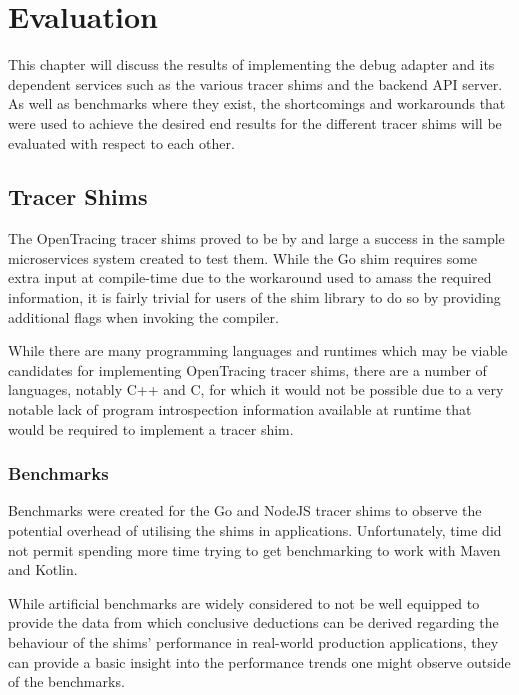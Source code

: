 \documentclass[12pt,pdftex,titlepage]{report}
\begin{document}
                    
    \chapter{Evaluation}
        This chapter will discuss the results of implementing the debug adapter and its dependent services such as the various tracer shims and the backend API server. As well as benchmarks where
        they exist, the shortcomings and workarounds that were used to achieve the desired end results for the different tracer shims will be evaluated with respect to each other.

        \bigskip
        \section{Tracer Shims}
            The OpenTracing tracer shims proved to be by and large a success in the sample microservices system created to test them. While the Go shim requires some extra input at compile-time due to the
            workaround used to amass the required information, it is fairly trivial for users of the shim library to do so by providing additional flags when invoking the compiler.

            While there are many programming languages and runtimes which may be viable candidates for implementing OpenTracing tracer shims, there are a number of languages, notably C++ and C, for which 
            it would not be possible due to a very notable lack of program introspection information available at runtime that would be required to implement a tracer shim.

            \subsection{Benchmarks}
                Benchmarks were created for the Go and NodeJS tracer shims to observe the potential overhead of utilising the shims in applications. Unfortunately, time did not permit spending more time 
                trying to get benchmarking to work with Maven and Kotlin. 

                While artificial benchmarks are widely considered to not be well equipped to provide the data from which conclusive deductions can be derived regarding the behaviour of the shims' 
                performance in real-world production applications, they can provide a basic insight into the performance trends one might observe outside of the benchmarks.
\end{document}
